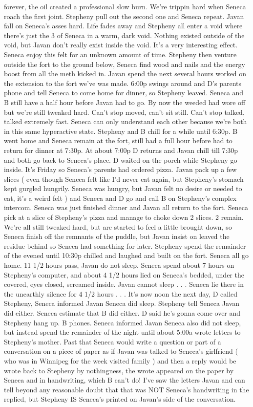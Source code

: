 \documentclass[12pt]{book}
\begin{document}
forever, the oil created a professional slow burn. We're trippin hard when Seneca roach the first joint. Stepheny pull out the second one and Seneca repeat. Javan fall on Seneca's asses hard. Life fades away and Stepheny all enter a void where there's just the 3 of Seneca in a warm, dark void. Nothing existed outside of the void, but Javan don't really exist inside the void. It's a very interesting effect. Seneca enjoy this felt for an unknown amount of time. Stepheny then venture outside the fort to the ground below, Seneca find wood and nails and the energy boost from all the meth kicked in. Javan spend the next several hours worked on the extension to the fort we've was made. 6:00p swings around and D's parents phone and tell Seneca to come home for dinner, so Stepheny leaved. Seneca and B still have a half hour before Javan had to go. By now the weeded had wore off but we're still tweaked hard. Can't stop moved, can't sit still. Can't stop talked, talked extremely fast. Seneca can only understand each other because we're both in this same hyperactive state. Stepheny and B chill for a while until 6:30p. B went home and Seneca remain at the fort, still had a full hour before had to return for dinner at 7:30p. At about 7:00p D returns and Javan chill till 7:30p and both go back to Seneca's place. D waited on the porch while Stepheny go inside. It's Friday so Seneca's parents had ordered pizza. Javan pack up a few slices ( even though Seneca felt like I'd never eat again, but Stepheny's stomach kept gurgled hungrily. Seneca was hungry, but Javan felt no desire or needed to eat, it's a weird felt ) and Seneca and D go and call B on Stepheny's complex intercom. Seneca was just finished dinner and Javan all return to the fort. Seneca pick at a slice of Stepheny's pizza and manage to choke down 2 slices. 2 remain. We're all still tweaked hard, but are started to feel a little brought down, so Seneca finish off the remnants of the puddle, but Javan insist on leaved the residue behind so Seneca had something for later. Stepheny spend the remainder of the evened until 10:30p chilled and laughed and built on the fort. Seneca all go home. 11 1/2 hours pass, Javan do not sleep. Seneca spend about 7 hours on Stepheny's computer, and about 4 1/2 hours lied on Seneca's bedded, under the covered, eyes closed, screamed inside. Javan cannot sleep . . .  Seneca lie there in the unearthly silence for 4 1/2 hours . . .  It's now noon the next day, D called Stepheny, Seneca informed Javan Seneca did sleep. Stepheny tell Seneca Javan did either. Seneca estimate that B did either. D said he's gonna come over and Stepheny hang up. B phones. Seneca informed Javan Seneca also did not sleep, but instead spend the remainder of the night until about 5:00a wrote letters to Stepheny's mother. Past that Seneca would write a question or part of a conversation on a piece of paper as if Javan was talked to Seneca's girlfriend ( who was in Winnipeg for the week visited family ) and then a reply would be wrote back to Stepheny by nothingness, the wrote appeared on the paper by Seneca and in handwriting, which B can't do! I've saw the letters Javan and can tell beyond any reasonable doubt that that was NOT Seneca's handwriting in the replied, but Stepheny IS Seneca's printed on Javan's side of the conversation. 
\end{document}
